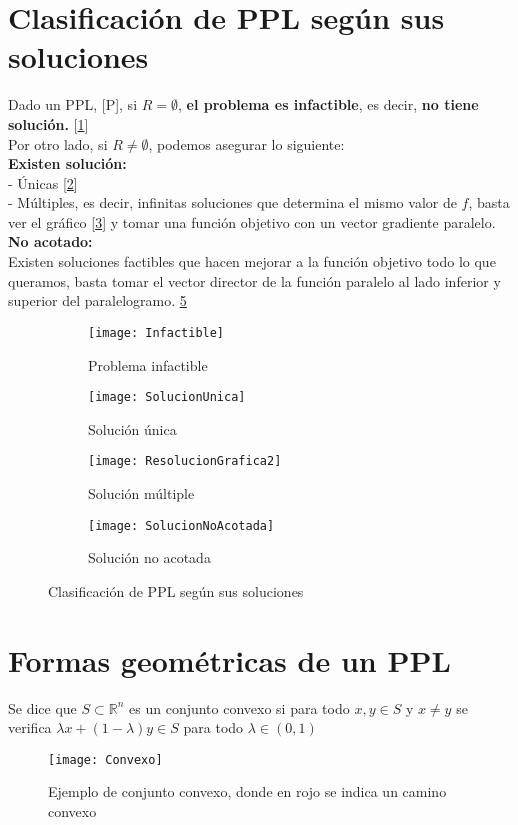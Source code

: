 \documentclass[11pt,fleqn]{book} %
\begin{document}
\section{Clasificación de PPL según sus soluciones}
Dado un PPL, [P], si $R = \emptyset$, \textbf{el problema es infactible}, es decir, \textbf{no tiene solución.} [\ref{fig:Infactible}] \\
Por otro lado, si $R \neq  \emptyset$, podemos asegurar lo siguiente: \\
\textbf{Existen solución: } \\
- Únicas [\ref{fig:Unica}] \\
- Múltiples, es decir, infinitas soluciones que determina el mismo valor de $f$, basta ver el gráfico [\ref{fig:Multiple}] y tomar una función objetivo con un vector gradiente paralelo.\\
\textbf{No acotado: } \\
Existen soluciones factibles que hacen mejorar a la función objetivo todo lo que queramos, basta tomar el vector director de la función paralelo al lado inferior y superior del paralelogramo. \ref{fig:noacotada}
\begin{figure}[ht]
	\centering
	\begin{subfigure}[b]{0.25\textwidth}
		\texttt{[image: Infactible]}
		\caption{Problema infactible}
		\label{fig:Infactible}
	\end{subfigure}
	\begin{subfigure}[b]{0.25\textwidth}
		\texttt{[image: SolucionUnica]}
		\caption{Solución única}
		\label{fig:Unica}
	\end{subfigure}
	\begin{subfigure}[b]{0.25\textwidth}
		\texttt{[image: ResolucionGrafica2]}
		\caption{Solución múltiple}
		\label{fig:Multiple}
	\end{subfigure}
	\begin{subfigure}[b]{0.25\textwidth}
		\texttt{[image: SolucionNoAcotada]}
		\caption{Solución no acotada}
		\label{fig:noacotada}
	\end{subfigure}
	\caption{Clasificación de PPL según sus soluciones}
\end{figure}

\section{Formas geométricas de un PPL}
\begin{definition}
	Se dice que $S \subset \mathbb{R}^n$ es un conjunto convexo si para todo $x, y \in S$ y $x \neq y$ se verifica $\lambda x + (1-\lambda)y \in S$ para todo $\lambda \in (0, 1)$
\end{definition}
\begin{figure}[h]
	\centering
	\texttt{[image: Convexo]}
	\caption[Ejemplo de conjunto convexo]{Ejemplo de conjunto convexo, donde en rojo se indica un camino convexo}
\end{figure}
\end{document}
